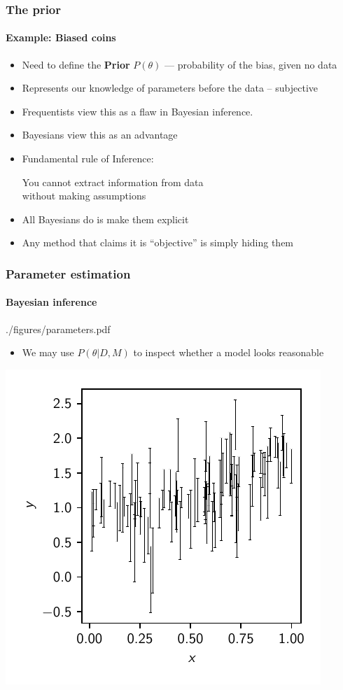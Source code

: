 \documentclass[%
]{beamer}
\begin{document}
\begin{frame}
    \frametitle{The prior}
    \framesubtitle{Example: Biased coins}
    \begin{itemize}
        \item Need to define the \textbf{Prior} $P(\theta)$ --- probability of the bias, given no data
        \item Represents our knowledge of parameters before the data -- subjective
        \item Frequentists view this as a flaw in Bayesian inference. 
        \item Bayesians view this as an advantage
        \item Fundamental rule of Inference:\pause\\
            \vfill
            \begin{center}
                \Large You cannot extract information from data\\ without making assumptions 
            \end{center}
            \vfill
        \item All Bayesians do is make them explicit
        \item Any method that claims it is ``objective'' is simply hiding them
    \end{itemize}
\end{frame}

\begin{frame}
    \frametitle{Parameter estimation}
    \framesubtitle{Bayesian inference}
    \begin{figright}[0.3]{./figures/parameters.pdf}
        \begin{itemize}
            \item We may use $P(\theta|D,M)$ to inspect whether a model looks reasonable
        \end{itemize}
        \includegraphics[width=\textwidth]{./figures/data.pdf}
    \end{figright}
\end{frame}
\end{document}
